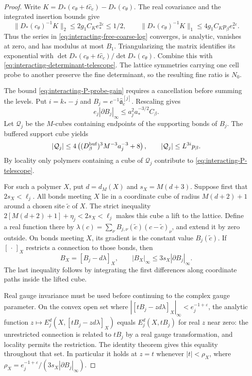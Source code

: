 \begin{proof}
Write $K=D_*(c_\theta+t\widehat c_c)-D_*(c_\theta)$.
The real covariance and the integrated insertion
bounds give
\[
 \|D_*(c_\theta)^{-1}K\|_2\le
           2g_1C_Ke_*^{2\varepsilon}\le1/2,\qquad
 \|D_*(c_\theta)^{-1}K\|_1
           \le4g_1C_Kp_\beta e_*^{2\varepsilon}.
\]
Thus the series in \eqref{eq:interacting-free-coarse-log}
converges, is analytic, vanishes at zero, and
has modulus at most $B_1$. Triangularizing
the matrix identifies its exponential with
$\det D_*(c_\theta+t\widehat c_c)/\det D_*(c_\theta)$.
Combine this with
\eqref{eq:interacting-determinant-telescope}.
The lattice symmetries carrying one cell
probe to another preserve the fine determinant,
so the resulting fine ratio is $N_0$.

The bound \eqref{eq:interacting-P-probe-gain}
requires a cancellation before summing the levels.
Put $i=k_*-j$ and $B_j=e^{-1}\widehat{\mathfrak a}_c^{[j]}$.
Rescaling gives
\begin{equation}\label{eq:interacting-probe-derivative}
 e_j|\partial B_j|_\infty\le
                         a_j^2a_*^{-3/2}C_\beta .
\end{equation}
Let $\mathcal Q_j$ be the $M$-cubes containing
endpoints of the supporting bonds of $B_j$.
The buffered support cube yields
\begin{equation}\label{eq:interacting-probe-cube-count}
 |\mathcal Q_j|\le
 4\left((D_\beta^{\rm buf})^3M^{-3}a_j^{-3}+8\right),
 \qquad |\mathcal Q_j|\le L^{3i}p_\beta .
\end{equation}
By locality only polymers containing a cube
of $\mathcal Q_j$ contribute to
\eqref{eq:interacting-P-telescope}.

For such a polymer $X$, put $d=d_M(X)$ and
$s_X=M(d+3)$. Suppose first that $2s_X<\ell_j$.
All bonds meeting $X$ lie in a coordinate
cube of radius $M(d+2)+1$ around a chosen
site $\tilde c$ of $X$. The strict inequality
$2[M(d+2)+1]+\eta_j<2s_X<\ell_j$
makes this cube a lift to the lattice.
Define a real function there by
$\lambda(c)=\sum_\nu B_{j,\nu}(\tilde c)(c-\tilde c)_\nu$,
and extend it by zero outside. On bonds meeting
$X$, its gradient is the constant value
$B_j(\tilde c)$. If $[\,\cdot\,]_X$ restricts
a connection to those bonds, then
\[
 B_X=[B_j-d\lambda]_X,\qquad
 |B_X|_\infty\le3s_X|\partial B_j|_\infty.
\]
The last inequality follows by integrating
the first differences along coordinate paths
inside the lifted cube.

Real gauge invariance must be used before
continuing to the complex gauge parameter.
On the convex open set where
$|[tB_j-zd\lambda]_X|_\infty<e_j^{-1+\varepsilon}$,
the analytic function
$z\mapsto E_j^d(X,[tB_j-zd\lambda]_X)$
equals $E_j^d(X,tB_j)$ for real $z$ near zero:
the unrestricted connection is related to
$tB_j$ by a real gauge transformation, and
locality permits the restriction. The identity
theorem gives this equality throughout that
set. In particular it holds at $z=t$
whenever $|t|<\rho_X$, where
$\rho_X=e_j^{-1+\varepsilon}/(3s_X|\partial B_j|_\infty)$.


\end{proof}

